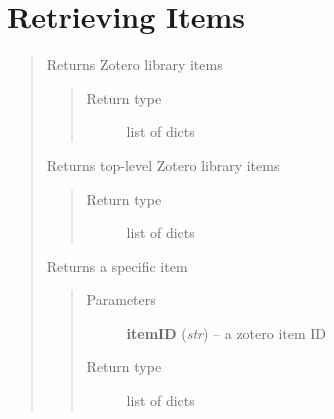 \documentclass[letterpaper,10pt,english]{sphinxmanual}
\begin{document}
\section{Retrieving Items}
\label{index:retrieving-items}\begin{quote}


\begin{fulllineitems}
\label{index:pyzotero.zotero.Zotero.items}
Returns Zotero library items
\begin{quote}\begin{description}
\item[{Return type}] \leavevmode
list of dicts

\end{description}\end{quote}

\end{fulllineitems}



\begin{fulllineitems}
\label{index:pyzotero.zotero.Zotero.top}
Returns top-level Zotero library items
\begin{quote}\begin{description}
\item[{Return type}] \leavevmode
list of dicts

\end{description}\end{quote}

\end{fulllineitems}



\begin{fulllineitems}
\label{index:pyzotero.zotero.Zotero.item}
Returns a specific item
\begin{quote}\begin{description}
\item[{Parameters}] \leavevmode
\textbf{itemID} (\emph{str}) -- a zotero item ID

\item[{Return type}] \leavevmode
list of dicts

\end{description}\end{quote}


\end{fulllineitems}
\end{quote}
\end{document}
